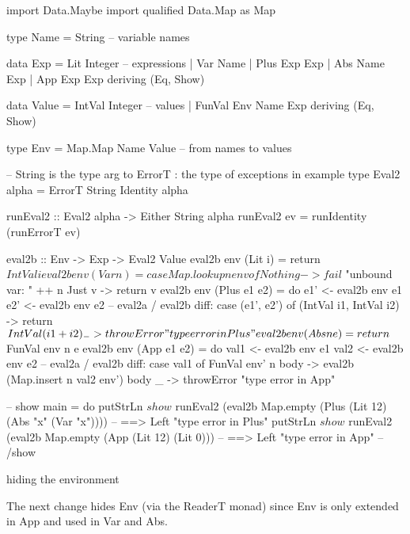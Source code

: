 import                 Data.Maybe
import qualified       Data.Map as Map

type Name   =  String                -- variable names

data Exp    =  Lit  Integer          -- expressions
            |  Var  Name
            |  Plus Exp  Exp
            |  Abs  Name Exp
            |  App  Exp  Exp
            deriving (Eq, Show)

data Value  =  IntVal Integer        -- values
            |  FunVal Env Name Exp
            deriving (Eq, Show)

type Env    =  Map.Map Name Value    -- from names to values

-- String is the type arg to ErrorT : the type of exceptions in example
type Eval2 alpha = ErrorT String Identity alpha

runEval2     :: Eval2 alpha -> Either String alpha
runEval2 ev  = runIdentity (runErrorT ev)

eval2b                 :: Env -> Exp -> Eval2 Value
eval2b env (Lit  i)     = return $ IntVal i
eval2b env (Var  n)     = case Map.lookup n env of
                              Nothing -> fail $ "unbound var: " ++ n
                              Just v  -> return v
eval2b env (Plus e1 e2) = do  e1'  <- eval2b env e1
                              e2'  <- eval2b env e2
                              -- eval2a / eval2b diff:
                              case (e1', e2') of
                                  (IntVal i1, IntVal i2) -> return $ IntVal (i1 + i2)
                                  _                      -> throwError "type error in Plus"
eval2b env (Abs  n  e)  = return $ FunVal env n e
eval2b env (App  e1 e2) = do  val1  <- eval2b env e1
                              val2  <- eval2b env e2
                              -- eval2a / eval2b diff:
                              case val1 of
                                  FunVal env' n body -> eval2b (Map.insert n val2 env') body
                                  _                  -> throwError "type error in App"

-- show
main = do
    putStrLn $ show $ runEval2 (eval2b Map.empty (Plus (Lit 12) (Abs "x" (Var "x"))))
    -- ==> Left "type error in Plus"
    putStrLn $ show $ runEval2 (eval2b Map.empty (App (Lit 12) (Lit 0)))
    -- ==> Left "type error in App"
-- /show

hiding the environment

The next change hides Env (via the ReaderT monad) since Env is only extended in App and used in Var and Abs.

